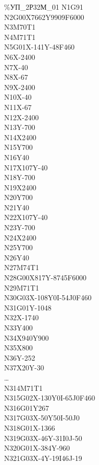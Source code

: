 \documentclass[11pt,twoside,openany]{report}
\begin{document}
\begin{figure}
\begin{multicols}{3}
  \%УП\_2Р32М\_01
  N1G91 \\
  N2G00X7662Y9909F6000 \\
  N3M70T1 \\
  N4M71T1 \\
  N5G01X-141Y-48F460 \\
  N6X-2400  \\
  N7X-40  \\
  N8X-67  \\
  N9X-2400  \\
  N10X-40 \\
  N11X-67 \\
  N12X-2400 \\
  N13Y-700  \\
  N14X2400  \\
  N15Y700 \\
  N16Y40  \\
  N17X107Y-40 \\
  N18Y-700  \\
  N19X2400  \\
  N20Y700 \\
  N21Y40  \\
  N22X107Y-40 \\
  N23Y-700  \\
  N24X2400  \\
  N25Y700 \\
  N26Y40  \\
  N27M74T1  \\
  N28G00X817Y-8745F6000 \\
  N29M71T1  \\
  N30G03X-108Y0I-54J0F460 \\
  N31G01Y-1048  \\
  N32X-1740 \\
  N33Y400 \\
  N34X940Y900 \\
  N35X800 \\
  N36Y-252  \\
  N37X20Y-30  \\
  … \\
  N314M71T1 \\
  N315G02X-130Y0I-65J0F460  \\
  N316G01Y267 \\
  N317G03X-50Y50I-50J0  \\
  N318G01X-1366 \\
  N319G03X-46Y-31I0J-50 \\
  N320G01X-384Y-960 \\
  N321G03X-4Y-19I46J-19 \\

\end{multicols}
\end{figure}
\end{document}

